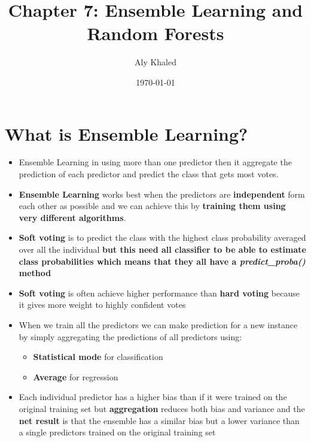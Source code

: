 \documentclass{article}
\title{Chapter 7: Ensemble Learning and Random Forests}
\author{Aly Khaled}
\date{\today}
\begin{document}
 
    \maketitle
    \section{What is Ensemble Learning?}
    \begin{itemize}
    \item Ensemble Learning in using more than one predictor then it aggregate the prediction of each predictor and predict the class that gets most votes. 
    \item \textbf{Ensemble Learning} works best when the predictors are \textbf{independent} form each other as possible and we can achieve this by \textbf{training them using very different algorithms}.
    \item \textbf{Soft voting} is to predict the class with the highest class probability averaged over all the individual \textbf{but this need all classifier to be able to estimate class probabilities which means that they all have a \textit{predict\_proba()} method}
    \item \textbf{Soft voting} is often achieve higher performance than \textbf{hard voting} because it gives more weight to highly confident votes
    \item When we train all the predictors we can make prediction for a new instance by simply aggregating the predictions of all predictors using:
    	\begin{itemize}
    		\item \textbf{Statistical mode} for classification
    		\item \textbf{Average} for regression 
    	\end{itemize}
    \item Each individual predictor has a higher bias than if it were trained on the original training set but \textbf{aggregation} reduces both bias and variance and the \textbf{net result} is that the ensemble has a similar bias but a lower variance than a single predictors trained on the original training set
    \end{itemize}
   
\end{document}
